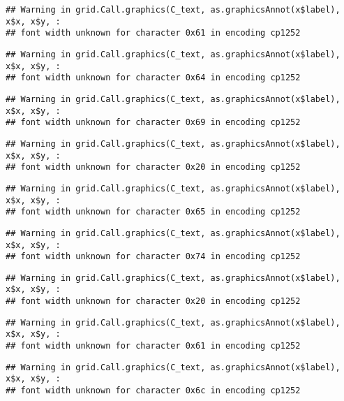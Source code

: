 \documentclass[
]{article}
\begin{document}
\begin{verbatim}
## Warning in grid.Call.graphics(C_text, as.graphicsAnnot(x$label), x$x, x$y, :
## font width unknown for character 0x61 in encoding cp1252
\end{verbatim}

\begin{verbatim}
## Warning in grid.Call.graphics(C_text, as.graphicsAnnot(x$label), x$x, x$y, :
## font width unknown for character 0x64 in encoding cp1252
\end{verbatim}

\begin{verbatim}
## Warning in grid.Call.graphics(C_text, as.graphicsAnnot(x$label), x$x, x$y, :
## font width unknown for character 0x69 in encoding cp1252
\end{verbatim}

\begin{verbatim}
## Warning in grid.Call.graphics(C_text, as.graphicsAnnot(x$label), x$x, x$y, :
## font width unknown for character 0x20 in encoding cp1252
\end{verbatim}

\begin{verbatim}
## Warning in grid.Call.graphics(C_text, as.graphicsAnnot(x$label), x$x, x$y, :
## font width unknown for character 0x65 in encoding cp1252
\end{verbatim}

\begin{verbatim}
## Warning in grid.Call.graphics(C_text, as.graphicsAnnot(x$label), x$x, x$y, :
## font width unknown for character 0x74 in encoding cp1252
\end{verbatim}

\begin{verbatim}
## Warning in grid.Call.graphics(C_text, as.graphicsAnnot(x$label), x$x, x$y, :
## font width unknown for character 0x20 in encoding cp1252
\end{verbatim}

\begin{verbatim}
## Warning in grid.Call.graphics(C_text, as.graphicsAnnot(x$label), x$x, x$y, :
## font width unknown for character 0x61 in encoding cp1252
\end{verbatim}

\begin{verbatim}
## Warning in grid.Call.graphics(C_text, as.graphicsAnnot(x$label), x$x, x$y, :
## font width unknown for character 0x6c in encoding cp1252
\end{verbatim}
\end{document}
